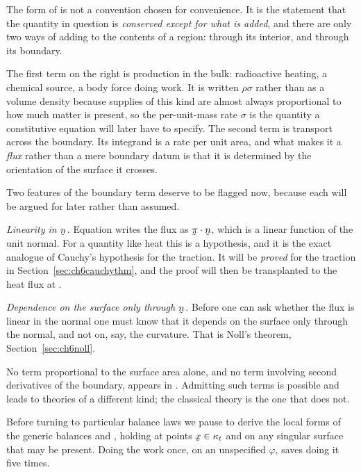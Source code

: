 \begin{remark}\label{rem:ch6three}
The form of  is not a convention chosen for convenience. It is
the statement that the quantity in question is \emph{conserved except
for what is added}, and there are only two ways of adding to the
contents of a region: through its interior, and through its boundary.

The first term on the right is production in the bulk: radioactive
heating, a chemical source, a body force doing work. It is written
$\rho\sigma$ rather than as a volume density because supplies of this
kind are almost always proportional to how much matter is present, so
the per-unit-mass rate $\sigma$ is the quantity a constitutive equation
will later have to specify. The second term is transport across the
boundary. Its integrand is a rate per unit area, and what makes it a
\emph{flux} rather than a mere boundary datum is that it is determined
by the orientation of the surface it crosses.

Two features of the boundary term deserve to be flagged now, because
each will be argued for later rather than assumed.

\emph{Linearity in $\bn$.} Equation  writes the flux as
$\ip{\vek{\pi}}\bn$, which is a linear function of the unit normal.
For a quantity like heat this is a hypothesis, and it is the exact
analogue of Cauchy's hypothesis for the traction. It will be
\emph{proved} for the traction in Section~\ref{sec:ch6cauchythm}, and
the proof will then be transplanted to the heat flux at .

\emph{Dependence on the surface only through $\bn$.} Before one can ask
whether the flux is linear in the normal one must know that it depends
on the surface only through the normal, and not on, say, the curvature.
That is Noll's theorem, Section~\ref{sec:ch6noll}.

No term proportional to the surface area alone, and no term involving
second derivatives of the boundary, appears in . Admitting
such terms is possible and leads to theories of a different kind; the
classical theory is the one that does not.
\end{remark}

Before turning to particular balance laws we pause to derive the local
forms of the generic balances  and , holding at
points $\bx\in\kappa_{t}$ and on any singular surface that may be
present. Doing the work once, on an unspecified $\varphi$, saves doing
it five times.

